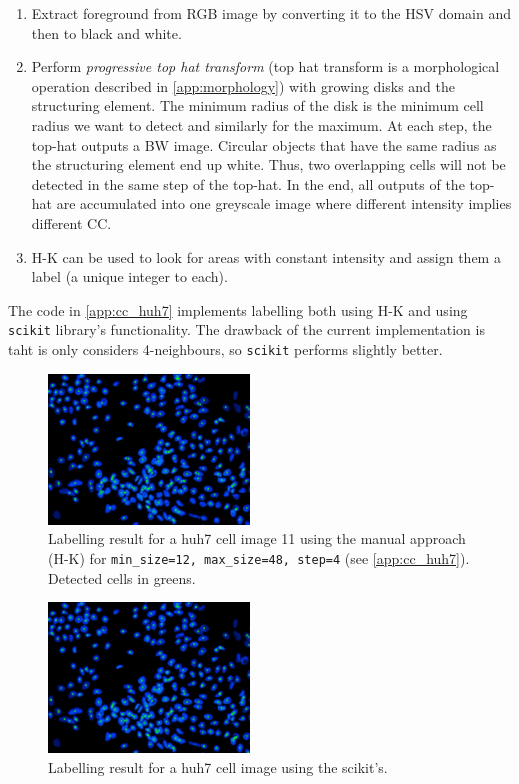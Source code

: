 \documentclass[a4paper]{article}
\begin{document}
\begin{enumerate}
    \item Extract foreground from RGB image by converting it to the HSV domain and then to black and white.
    \item Perform \textit{progressive top hat transform} (top hat transform is a morphological operation described in \ref{app:morphology}) with growing disks and the structuring element. The minimum radius of the disk is the minimum cell radius we want to detect and similarly for the maximum. At each step, the top-hat outputs a BW image. Circular objects that have the same radius as the structuring element end up white. Thus, two overlapping cells will not be detected in the same step of the top-hat. In the end, all outputs of the top-hat are accumulated into one greyscale image where different intensity implies different CC.
    \item H-K can be used to look for areas with constant intensity and assign them a label (a unique integer to each).
\end{enumerate}
The code in \ref{app:cc_huh7} implements labelling both using H-K and using \texttt{scikit} library's functionality. The drawback of the current implementation is taht is only considers 4-neighbours, so \texttt{scikit} performs slightly better.
\begin{multicols}{2}
\begin{figure}[H]
    \centering
    \includegraphics[height=4cm]{img/cc/huh7_test11_man.jpg}
    \caption{Labelling result for a huh7 cell image 11 using the manual approach (H-K) for \texttt{min_size=12, max_size=48, step=4} (see \ref{app:cc_huh7}). Detected cells in greens.}
\end{figure}
\columnbreak
\begin{figure}[H]
    \centering
    \includegraphics[height=4cm]{img/cc/huh7_test11_sci.jpg}
    \caption{Labelling result for a huh7 cell image using the scikit's.}
\end{figure}
\end{multicols}
\end{document}

